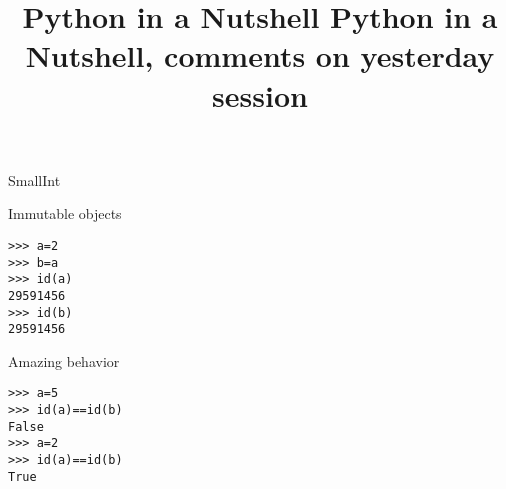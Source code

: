 \documentclass[colorlinks]{beamer}
\begin{document}
\setcounter{tocdepth}{2}

\title{ Python in a Nutshell}







\title{ Python in a Nutshell, comments on yesterday session}



\begin{frame}[plain]
   \maketitle
\end{frame}




\begin{frame}{SmallInt}
\begin{block}{Immutable objects}
\begin{verbatim}
>>> a=2
>>> b=a
>>> id(a)
29591456
>>> id(b)
29591456
\end{verbatim}

\end{block}
\begin{block}{Amazing behavior}
\begin{verbatim}
>>> a=5
>>> id(a)==id(b)
False
>>> a=2
>>> id(a)==id(b)
True
\end{verbatim}

\end{block}
\end{frame}
\end{document}

